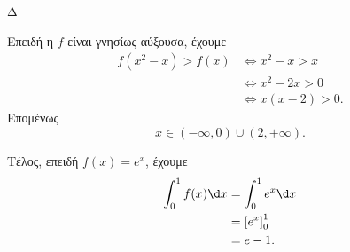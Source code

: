 \begin{thema}{Δ}
\begin{erwthma}
\item Επειδή η $f$ είναι γνησίως αύξουσα, έχουμε
\begin{align*}
f(x^2-x)>f(x)
&\Leftrightarrow
x^2-x>x\\
&\Leftrightarrow
x^2-2x>0\\
&\Leftrightarrow
x(x-2)>0.
\end{align*}
Επομένως
\[
{x\in(-\infty,0)\cup(2,+\infty)}.
\]

Τέλος, επειδή $f(x)=e^x$, έχουμε
\begin{align*}
\int_0^1f(x)\d x
&=\int_0^1e^x\d x\\
&=\left[e^x\right]_0^1\\
&={e-1}.
\end{align*}
\end{erwthma}
\end{thema}


